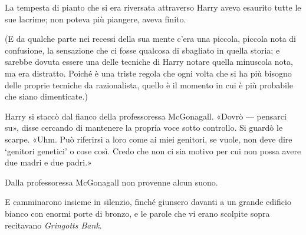 La tempesta di pianto che si era riversata attraverso Harry aveva esaurito tutte le sue lacrime; non poteva più piangere, aveva finito.

(E da qualche parte nei recessi della sua mente c’era una piccola, piccola nota di confusione, la sensazione che ci fosse qualcosa di sbagliato in quella storia; e sarebbe dovuta essere una delle tecniche di Harry notare quella minuscola nota, ma era distratto. Poiché è una triste regola che ogni volta che si ha più bisogno delle proprie tecniche da razionalista, quello è il momento in cui è più probabile che siano dimenticate.)

Harry si staccò dal fianco della professoressa McGonagall. «Dovrò — pensarci su», disse cercando di mantenere la propria voce sotto controllo. Si guardò le scarpe. «Uhm. Può riferirsi a loro come ai miei genitori, se vuole, non deve dire ‘genitori genetici’ o cose così. Credo che non ci sia motivo per cui non possa avere due madri e due padri.»

Dalla professoressa McGonagall non provenne alcun suono.

E camminarono insieme in silenzio, finché giunsero davanti a un grande edificio bianco con enormi porte di bronzo, e le parole che vi erano scolpite sopra recitavano \textit{Gringotts Bank}.
